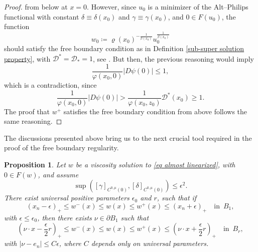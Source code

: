 \documentclass[reqno,11pt]{amsart}
\newtheorem{proposition}{Proposition}[section]
\newcommand{\1}{\mathds{1}}
\numberwithin{equation}{section}
\begin{document}
\begin{proof}
from below at $x = 0$. However, since $u_0$ is a minimizer of the Alt--Philips functional with constant $\delta \equiv \delta(x_0)$ and $\gamma \equiv \gamma(x_0)$, and $0 \in F(u_0)$, the function
$$
    w_0 \coloneqq \varrho(x_0)^{-\frac{1}{\beta(x_0)}} u_0^{\frac{1}{\beta(x_0)}}
$$
should satisfy the free boundary condition as in Definition \ref{sub-super solution property}, with $\mathcal{D}^\ast = \mathcal{D}_\ast = 1$, see \cite{AP}. But then, the previous reasoning would imply
$$
    \frac{1}{\varphi(x_0,0)}|D\psi(0)| \leq 1,
$$
which is a contradiction, since
$$
    \frac{1}{\varphi(x_0,0)}|D\psi(0)| > \frac{1}{\varphi(x_0,z_0)} \mathcal{D}^\ast(x_0) \geq 1.
$$
The proof that $w^+$ satisfies the free boundary condition from above follows the same reasoning.
\end{proof}

The discussions presented above bring us to the next crucial tool required in the proof of the free boundary regularity. 

\begin{proposition}\label{improvement of flatness}
Let $w$ be a viscosity solution to \eqref{eq almost linearized}, with $0 \in F(w)$, and assume
$$
    \sup\left([\gamma]_{C^{0,\mu}(0)}, [\delta]_{C^{0,\mu}(0)}\right) \leq \epsilon^2.
$$
There exist universal positive parameters $\epsilon_0$ and $r$, such that if
\begin{equation}\label{flat 1}
    (x_n - \epsilon)_+ \leq w^-(x) \leq w(x) \leq w^+(x) \leq (x_n + \epsilon)_+ \quad \text{in }\, B_1,
\end{equation}
with $\epsilon \leq \epsilon_0$, then there exists $\nu \in \partial B_1$ such that
\begin{equation}\label{improv flat 1}
    \left(\nu \cdot x - \frac{\epsilon}{2}r\right)_+ \leq w^-(x) \leq w(x) \leq w^+(x) \leq \left(\nu \cdot x + \frac{\epsilon}{2}r\right)_+ \quad \text{in }\, B_r,
\end{equation}
with $|\nu - e_n|\leq C\epsilon$, where $C$ depends only on universal parameters.
\end{proposition}
\end{document}
